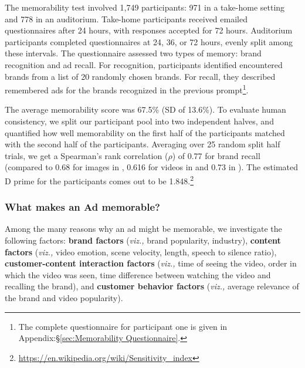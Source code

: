 The memorability test involved 1,749 participants: 971 in a take-home setting and 778 in an auditorium. Take-home participants received emailed questionnaires after 24 hours, with responses accepted for 72 hours. Auditorium participants completed questionnaires at 24, 36, or 72 hours, evenly split among these intervals. The questionnaire assessed two types of memory: brand recognition and ad recall. For recognition, participants identified encountered brands from a list of 20 randomly chosen brands. For recall, they described remembered ads for the brands recognized in the previous prompt\footnote{The complete questionnaire for participant one is given in Appendix:\S\ref{sec:Memorability Questionnaire}.}. 

The average memorability score was 67.5\% (SD of 13.6\%). 
To evaluate human consistency, we split our participant pool into two independent halves, and quantified how well memorability on the first half of the participants matched with the second half of the participants. Averaging over 25 random split half trials, we get a Spearman's rank correlation ($\rho$) of 0.77 for brand recall (compared to 0.68 for images in \cite{khosla2015understanding}, 0.616 for videos in \cite{cohendet2019videomem} and 0.73 in \cite{newman2020multimodal}). The estimated D prime for the participants comes out to be 1.848.\footnote{\url{https://en.wikipedia.org/wiki/Sensitivity_index}}


\subsubsection{What makes an Ad memorable?}
\label{sec:What makes an Ad memorable?}
Among the many reasons why an ad might be memorable, we investigate the following factors: \textbf{brand factors} (\textit{viz.,} brand popularity, industry), \textbf{content factors} (\textit{viz.,} video emotion, scene velocity, length, speech to silence ratio), \textbf{customer-content interaction factors} (\textit{viz.,} time of seeing the video, order in which the video was seen, time difference between watching the video and recalling the brand), and \textbf{customer behavior factors} (\textit{viz.,} average relevance of the brand and video popularity).


